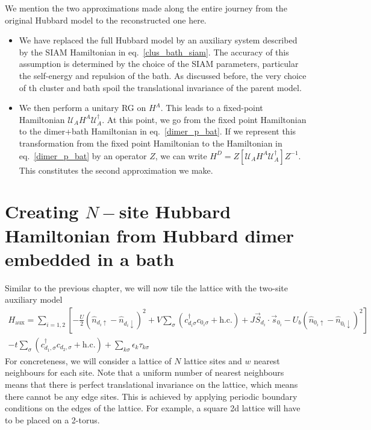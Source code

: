 \documentclass[10pt]{report}
\numberwithin{equation}{section}
\begin{document}
{ We mention the two approximations made along the entire journey from the original Hubbard model to the reconstructed one here.
 \begin{itemize}
 	\item We have replaced the full Hubbard model by an auxiliary system described by the SIAM Hamiltonian in eq.~\ref{clus_bath_siam}. The accuracy of this assumption is determined by the choice of the SIAM parameters, particular the self-energy and repulsion of the bath. As discussed before, the very choice of th cluster and bath spoil the translational invariance of the parent model.
 	\item We then perform a unitary RG on $H^A$. This leads to a fixed-point Hamiltonian $\mathcal{U}_A H^A \mathcal{U}_A^\dagger$. At this point, we go from the fixed point Hamiltonian to the dimer+bath Hamiltonian in eq.~\ref{dimer_p_bat}. If we represent this transformation from the fixed point Hamiltonian to the Hamiltonian in eq.~\ref{dimer_p_bat} by an operator \(Z\), we can write $H^D = Z\left[\mathcal{U}_A H^A \mathcal{U}_A^\dagger \right] Z^{-1}$. This constitutes the second approximation we make.
\end{itemize}
}


\section{Creating \(N-\)site Hubbard Hamiltonian from Hubbard dimer embedded in a bath}
Similar to the previous chapter, we will now tile the lattice with the two-site auxiliary model
\begin{equation}\begin{aligned}
	H_\text{aux} = \sum_{i=1,2} \left[- \frac{U}{2}\left(\hat n_{d_i \uparrow} - \hat n_{d_i \downarrow}\right)^2 + V\sum_{\sigma}\left(c^\dagger_{d_i\sigma}c_{0_i\sigma} + \text{h.c.}\right) + J \vec{S}_{d_i}\cdot\vec{s}_{0_i} - U_b\left(\hat n_{0_i \uparrow} - \hat n_{0_i \downarrow}\right)^2\right]\\
	 -t \sum_\sigma \left(c^\dagger_{d_1,\sigma}c_{d_2,\sigma} + \text{h.c.}\right) + \sum_{k\sigma}\epsilon_k \tau_{k\sigma}
\end{aligned}\end{equation}
For concreteness, we will consider a lattice of \(N\) lattice sites and \(w\) nearest neighbours for each site. Note that a uniform number of nearest neighbours means that there is perfect translational invariance on the lattice, which means there cannot be any edge sites. This is achieved by applying periodic boundary conditions on the edges of the lattice. For example, a square 2d lattice will have to be placed on a 2-torus.
\end{document}

